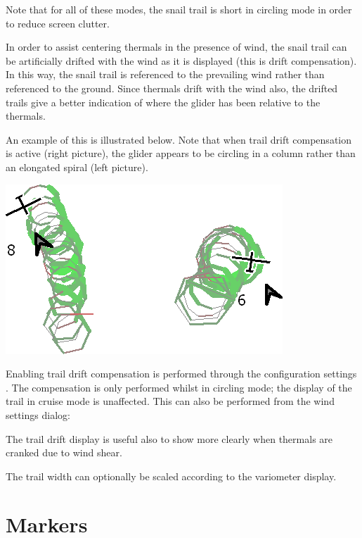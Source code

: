 Note that for all of these modes, the snail trail is short in
circling mode in order to reduce screen clutter.

In order to assist centering thermals in the presence of wind, the
snail trail can be artificially drifted with the wind as it is
displayed (this is drift compensation).  In this way, the snail trail
is referenced to the prevailing wind rather than referenced to the
ground.  Since thermals drift with the wind also, the drifted trails
give a better indication of where the glider has been relative to the
thermals.

An example of this is illustrated below.  Note that when trail drift
compensation is active (right picture), the glider appears to be
circling in a column rather than an elongated spiral (left picture).

\begin{center}
\includegraphics[angle=0,width=0.8\linewidth,keepaspectratio='true']{figures/traildrift.png}
\end{center}

Enabling trail drift compensation is performed through the
configuration settings .  The compensation is only performed
whilst in circling mode; the display of the trail in cruise mode is unaffected.
This can also be performed from the wind settings dialog:
\begin{quote}
\blink{}
\end{quote}

The trail drift display is useful also to show more clearly when thermals
are cranked due to wind shear.

The trail width can optionally be scaled according to the variometer display.

\section{Markers}\label{sec:markers}

